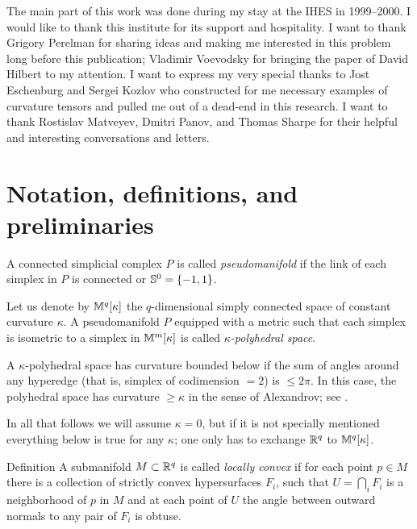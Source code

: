 \documentclass{article}
\begin{document}
The main part of this work was done during my stay at the IHES in 1999--2000.
I would like to thank this institute for  its support and hospitality.
I want to thank Grigory Perelman for sharing ideas and making me interested in this problem long before this publication; 
Vladimir Voevodsky for bringing the paper
of David Hilbert to my attention. 
I want to express my very special thanks to Jost Eschenburg and Sergei Kozlov who constructed for me
necessary examples of curvature tensors and pulled me out of a
dead-end in this research.
I want to thank Rostislav Matveyev, Dmitri Panov, and Thomas Sharpe for their helpful and interesting conversations and letters.


\section{Notation, definitions, and preliminaries}



A connected simplicial complex $P$ is called \emph{pseudomanifold}
if the link of each simplex in $P$ is connected or $\mathbb{S}^0=\{-1,1\}$.

Let us denote by $\mathbb{M}^q[\kappa]$ the $q$-dimensional simply connected space of constant curvature $\kappa$.
A pseudomanifold $P$ equipped with a metric 
such that each
simplex is isometric
to a simplex in $\mathbb{M}^m[\kappa]$
is called
\emph{$\kappa$-polyhedral space}. 

A $\kappa$-polyhedral space has curvature bounded below  if  the sum of angles
around any hyperedge (that is, simplex of codimension $=2$) is $\le 2\pi$.
In this case, the polyhedral space has curvature  $\ge \kappa$ in the sense of Alexandrov; see \cite{AKP}.

In all that follows we will assume $\kappa=0$,
but if it is not specially
mentioned everything below is true for any $\kappa$;
one only has to exchange $\mathbb{R}^q$ to $\mathbb{M}^q[\kappa]$.





\begin{thm}{Definition}
 A submanifold $M \subset \mathbb{R}^q$ is called
\emph{locally convex} if for each point $p\in M$ there is a collection of strictly convex hypersurfaces $F_i$,
such that $U=\bigcap_i F_i$ is a neighborhood of $p$ in $M$ and at each point of $U$ the angle between
outward normals to any pair of $F_i$ is obtuse.
\end{thm}
\end{document}
